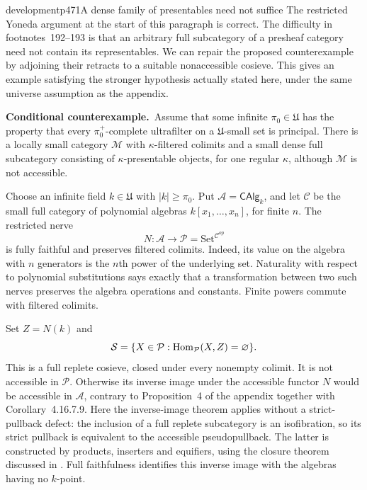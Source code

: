 
\begin{dcomment}{development}{p471}{A dense family of presentables need not suffice}
The restricted Yoneda argument at the start of this paragraph is correct. The difficulty in footnotes~192--193 is that an arbitrary full subcategory of a presheaf category need not contain its representables. We can repair the proposed counterexample by adjoining their retracts to a suitable nonaccessible cosieve. This gives an example satisfying the stronger hypothesis actually stated here, under the same universe assumption as the appendix.

\textbf{Conditional counterexample.}\ours\
Assume that some infinite $\pi_0\in\mathfrak U$ has the property that every $\pi_0^+$-complete ultrafilter on a $\mathfrak U$-small set is principal. There is a locally small category $\mathcal M$ with $\kappa$-filtered colimits and a small dense full subcategory consisting of $\kappa$-presentable objects, for one regular $\kappa$, although $\mathcal M$ is not accessible.

Choose an infinite field $k\in\mathfrak U$ with $|k|\ge\pi_0$. Put $\mathcal A=\mathsf{CAlg}_k$, and let $\mathcal C$ be the small full category of polynomial algebras $k[x_1,\ldots,x_n]$, for finite $n$. The restricted nerve
\[
 N:\mathcal A\longrightarrow\mathcal P=\mathrm{Set}^{\mathcal C^{op}}
\]
is fully faithful and preserves filtered colimits. Indeed, its value on the algebra with $n$ generators is the $n$th power of the underlying set. Naturality with respect to polynomial substitutions says exactly that a transformation between two such nerves preserves the algebra operations and constants. Finite powers commute with filtered colimits.

Set $Z=N(k)$ and
\[
 \mathcal S=\{X\in\mathcal P:\operatorname{Hom}_{\mathcal P}(X,Z)=\varnothing\}.
\]
This is a full replete cosieve, closed under every nonempty colimit. It is not accessible in $\mathcal P$. Otherwise its inverse image under the accessible functor $N$ would be accessible in $\mathcal A$, contrary to Proposition~4 of the appendix together with Corollary~4.16.7.9. Here the inverse-image theorem applies without a strict-pullback defect: the inclusion of a full replete subcategory is an isofibration, so its strict pullback is equivalent to the accessible pseudopullback. The latter is constructed by products, inserters and equifiers, using the closure theorem discussed in \citet[Appendix~A]{ChingRiehl2014}. Full faithfulness identifies this inverse image with the algebras having no $k$-point.


\end{dcomment}
